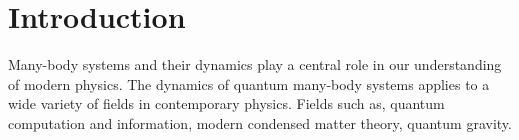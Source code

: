 \section{Introduction}


Many-body systems and their dynamics play a central role in our understanding of modern physics. 
The dynamics of quantum many-body systems applies to a wide variety of fields in contemporary physics. 
Fields such as, quantum computation and information, modern condensed matter theory, quantum gravity.